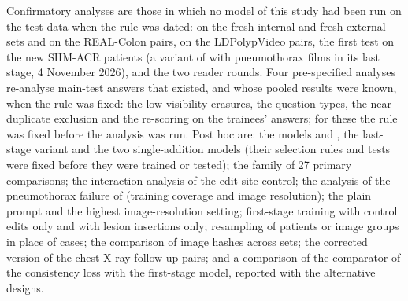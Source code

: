 Confirmatory analyses are those in which no model of this study had been run on the test data when the rule was dated: \ms{} on the fresh internal and fresh external sets and on the REAL-Colon pairs, \msn{} on the LDPolypVideo pairs, the first test on the new SIIM-ACR patients (a variant of \ms{} with pneumothorax films in its last stage, 4 November 2026), and the two reader rounds. Four pre-specified analyses re-analyse main-test answers that existed, and whose pooled results were known, when the rule was fixed: the low-visibility erasures, the question types, the near-duplicate exclusion and the re-scoring on the trainees' answers; for these the rule was fixed before the analysis was run. Post hoc are: the models \msp{} and \msn, the last-stage variant and the two single-addition models (their selection rules and tests were fixed before they were trained or tested); the family of 27 primary comparisons; the interaction analysis of the edit-site control; the analysis of the pneumothorax failure of \ms{} (training coverage and image resolution); the plain prompt and the highest image-resolution setting; first-stage training with control edits only and with lesion insertions only; resampling of patients or image groups in place of cases; the comparison of image hashes across sets; the corrected version of the chest X-ray follow-up pairs; and a comparison of the comparator of the consistency loss with the first-stage model, reported with the alternative designs.

